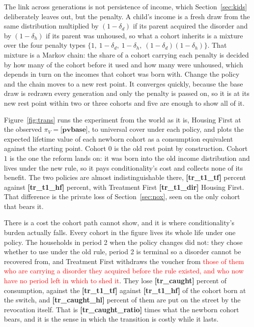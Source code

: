 \documentclass[10pt]{article}
\begin{document}
The link across generations is not persistence of income, which
Section~\ref{sec:kids} deliberately leaves out, but the penalty. A child's income
is a fresh draw from the same distribution multiplied by $(1-\delta_d)$ if its
parent acquired the disorder and by $(1-\delta_h)$ if its parent was unhoused, so
what a cohort inherits is a mixture over the four penalty types
$\{1,\ 1-\delta_d,\ 1-\delta_h,\ (1-\delta_d)(1-\delta_h)\}$. That mixture is a
Markov chain: the share of a cohort carrying each penalty is decided by how many
of the cohort before it used and how many were unhoused, which depends in turn on
the incomes that cohort was born with. Change the policy and the chain moves to a
new rest point. It converges quickly, because the base draw is redrawn every
generation and only the penalty is passed on, so it is at its new rest point
within two or three cohorts and five are enough to show all of it.

Figure~\ref{fig:trans} runs the experiment from the world as it
is, Housing First at the observed $\pi_V=\textbf{[pvbase]}$, to universal cover under
each policy, and plots the expected lifetime value of each newborn cohort as a
consumption equivalent against the starting point. Cohort $0$ is the old rest
point by construction. Cohort $1$ is the one the reform lands on: it was born
into the old income distribution and lives under the new rule, so it pays
conditionality's cost and collects none of its benefit. The two policies are
almost indistinguishable there, \textbf{[tr_t1_tf]} percent against \textbf{[tr_t1_hf]} percent,
with Treatment First \textbf{[tr_t1_dir]} Housing First. That difference is the private loss
of Section~\ref{sec:nox}, seen on the only cohort that bears it.

There is a cost the cohort path cannot show, and it is where conditionality's
burden actually falls. Every cohort in the figure lives its whole life under one
policy. The households in period 2 when the policy changes did not: they chose
whether to use under the old rule, period 2 is terminal so a disorder cannot be
recovered from, and Treatment First withdraws the voucher from \textcolor{red}{those of them who
are carrying a disorder they acquired before the rule existed, and who now have
no period left in which to shed it}. They lose \textbf{[tr_caught]} percent of consumption, against
the \textbf{[tr_t1_tf]} against \textbf{[tr_t1_hf]} of the cohort born at the switch, and
\textbf{[tr_caught_hl]} percent of them are put on the street by the revocation itself.
That is \textbf{[tr_caught_ratio]} times what the newborn cohort bears, and it is the
sense in which the transition is costly while it lasts.
\end{document}
